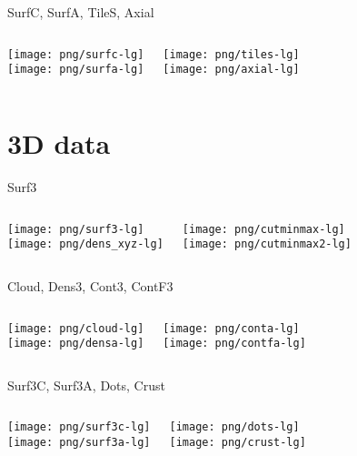 \documentclass[color=usenames]{beamer}
\begin{document}
\begin{frame}{SurfC, SurfA, TileS, Axial}
\begin{columns}
\texttt{[image: png/surfc-lg]}\\
\texttt{[image: png/surfa-lg]}

\texttt{[image: png/tiles-lg]}\\
\texttt{[image: png/axial-lg]}

\end{columns}
\end{frame}


\section{3D data}

\begin{frame}{Surf3}
\begin{columns}
\texttt{[image: png/surf3-lg]}\\
\texttt{[image: png/dens\_xyz-lg]}

\texttt{[image: png/cutminmax-lg]}\\
\texttt{[image: png/cutminmax2-lg]}

\end{columns}
\end{frame}

\begin{frame}{Cloud, Dens3, Cont3, ContF3}
\begin{columns}
\texttt{[image: png/cloud-lg]}\\
\texttt{[image: png/densa-lg]}

\texttt{[image: png/conta-lg]}\\
\texttt{[image: png/contfa-lg]}

\end{columns}
\end{frame}

\begin{frame}{Surf3C, Surf3A, Dots, Crust}
\begin{columns}
\texttt{[image: png/surf3c-lg]}\\
\texttt{[image: png/surf3a-lg]}

\texttt{[image: png/dots-lg]}\\
\texttt{[image: png/crust-lg]}

\end{columns}
\end{frame}
\end{document}
